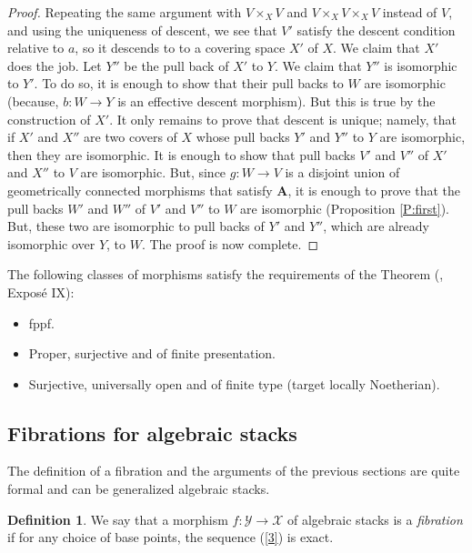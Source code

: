 \documentclass{amsart}
\theoremstyle{definition}
\newtheorem{defn}[thm]{Definition}
\theoremstyle{remark}
\theoremstyle{remark}
\newcommand{\X}{\mathcal{X}}
\newcommand{\Y}{\mathcal{Y}}
\newcommand{\x}{\times}
\let\:=\colon
\begin{document}
\begin{proof}
  Repeating the same argument  with $V \x_X V$ and $V \x_X V \x_X V$
  instead of $V$, and using the uniqueness
of descent, we see that $V'$   satisfy the descent condition
relative to $a$, so it descends to to a covering space $X'$ of
$X$. We claim that $X'$ does the job. Let $Y''$ be the pull back
of $X'$ to $Y$. We claim that $Y''$ is isomorphic to $Y'$. To do
so, it is enough to show that their pull backs to $W$ are
isomorphic (because, $b \: W \to Y$ is an effective descent
morphism). But this is true by the construction of $X'$. It only
remains to prove that descent is unique; namely, that if $X'$ and
$X''$ are two covers of $X$ whose pull backs $Y'$ and $Y''$ to $Y$
are isomorphic, then they are isomorphic. It is enough to show
that pull backs $V'$ and $V''$ of
 $X'$ and $X''$ to $V$ are isomorphic. But, since $g \: W \to V$ is
 a disjoint union of geometrically
 connected morphisms that satisfy $\mathbf{A}$, it is enough to prove that  the pull backs
 $W'$ and $W''$ of $V'$ and $V''$ to $W$ are isomorphic (Proposition \ref{P:first}).
 But, these two are isomorphic to pull backs of $Y'$ and $Y''$, which are already
 isomorphic over $Y$, to $W$.
 The proof is now complete.
\end{proof}

 The following classes of morphisms satisfy the requirements of the Theorem
 (\cite{SGA1}, Expos\'{e} IX):

\begin{itemize}
\item fppf.

\item Proper, surjective and of finite presentation.

\item Surjective, universally open and of finite type (target locally Noetherian).
\end{itemize}

\subsection{Fibrations for algebraic stacks}{\label{S:3}}

The definition of a fibration and the arguments of the previous
sections are quite formal and can be generalized algebraic stacks.
\begin{defn}{\label{D:stfib}}
We say that a  morphism $f \:\Y \to \X$ of algebraic stacks is a
{\em fibration} if for any choice of base points, the sequence
(\ref{3}) is exact.
\end{defn}
\end{document}
